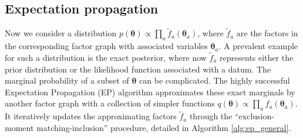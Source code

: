 \subsection{Expectation propagation}
\label{sec:chap2_ep_algorithm}

Now we consider a distribution $p(\bm{\theta}) \propto \prod_{a} \tilde{f}_a(\bm{\theta}_a)$, where $\tilde{f}_a$ are the factors in the corresponding factor graph with associated variables $\bm{\theta}_a$. A prevalent example for such a distribution is the exact posterior, where now $\tilde{f}_a$ represents either the prior distribution or the likelihood function associated with a datum. The marginal probability of a subset of $\bm{\theta}$ can be complicated. The highly successful Expectation Propagation (EP) \citep{minka:ep2001} algorithm approximates these exact marginals by another factor graph with a collection of simpler functions $q(\bm{\theta}) \propto \prod_{a} f_a(\bm{\theta}_a)$. It iteratively updates the approximating factors $\tilde{f}_a$ through the ``exclusion-moment matching-inclusion'' procedure, detailed in Algorithm \ref{alg:ep_general}.


